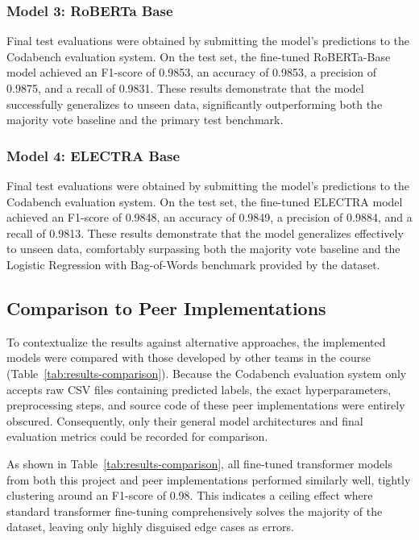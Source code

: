 \documentclass[11pt]{article}
\begin{document}
\subsubsection{Model 3: RoBERTa Base}
Final test evaluations were obtained by submitting the model's predictions to the Codabench evaluation system. On the test set, the fine-tuned RoBERTa-Base model achieved an F1-score of 0.9853, an accuracy of 0.9853, a precision of 0.9875, and a recall of 0.9831. These results demonstrate that the model successfully generalizes to unseen data, significantly outperforming both the majority vote baseline and the primary test benchmark.

\subsubsection{Model 4: ELECTRA Base}
Final test evaluations were obtained by submitting the model's predictions to the Codabench evaluation system. On the test set, the fine-tuned ELECTRA model achieved an F1-score of 0.9848, an accuracy of 0.9849, a precision of 0.9884, and a recall of 0.9813. These results demonstrate that the model generalizes effectively to unseen data, comfortably surpassing both the majority vote baseline and the Logistic Regression with Bag-of-Words benchmark provided by the dataset.

\subsection{Comparison to Peer Implementations}
To contextualize the results against alternative approaches, the implemented models were compared with those developed by other teams in the course (Table~\ref{tab:results-comparison}). Because the Codabench evaluation system only accepts raw CSV files containing predicted labels, the exact hyperparameters, preprocessing steps, and source code of these peer implementations were entirely obscured. Consequently, only their general model architectures and final evaluation metrics could be recorded for comparison. 

As shown in Table~\ref{tab:results-comparison}, all fine-tuned transformer models from both this project and peer implementations performed similarly well, tightly clustering around an F1-score of 0.98. This indicates a ceiling effect where standard transformer fine-tuning comprehensively solves the majority of the dataset, leaving only highly disguised edge cases as errors. 
\end{document}
